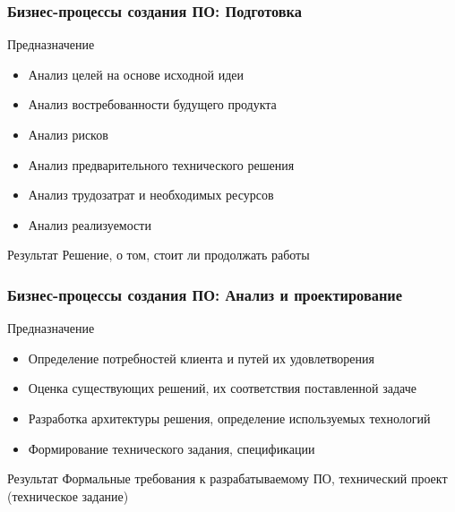 \documentclass{../industrial-development}
\begin{document}
\begin{frame} \frametitle{Бизнес-процессы создания ПО: Подготовка}
	\begin{block}{Предназначение}
		\begin{itemize}
			\item Анализ целей на основе исходной идеи
			\item Анализ востребованности будущего продукта
			\item Анализ рисков
			\item Анализ предварительного технического решения
			\item Анализ трудозатрат и необходимых ресурсов
			\item Анализ реализуемости
		\end{itemize}
	\end{block}
	\begin{block}{Результат}
		Решение, о том, стоит ли продолжать работы
	\end{block}
\end{frame}


\begin{frame} \frametitle{Бизнес-процессы создания ПО: Анализ и проектирование}
	\begin{block}{Предназначение}
		\begin{itemize}
			\item Определение потребностей клиента и путей их удовлетворения
			\item Оценка существующих решений, их соответствия поставленной задаче
			\item Разработка архитектуры решения, определение используемых технологий
			\item Формирование технического задания, спецификации
		\end{itemize}
	\end{block}
	\begin{block}{Результат}
		Формальные требования к разрабатываемому ПО, технический проект (техническое задание)
	\end{block}
\end{frame}

\lecturenotes
\end{document}
